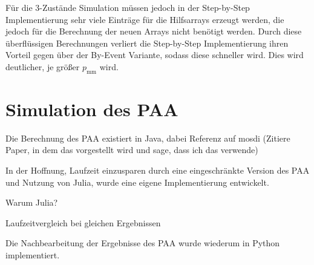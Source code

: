Für die 3-Zustände Simulation müssen jedoch in der Step-by-Step Implementierung sehr viele Einträge für die Hilfsarrays erzeugt werden, die jedoch für die Berechnung der neuen Arrays nicht benötigt werden. Durch diese überflüssigen Berechnungen verliert die Step-by-Step Implementierung ihren Vorteil gegen über der By-Event Variante, sodass diese schneller wird. Dies wird deutlicher, je größer $p_{\text{mm}}$ wird.


\section{Simulation des PAA}
Die Berechnung des PAA existiert in Java, dabei Referenz auf mosdi (Zitiere Paper, in dem das vorgestellt wird und sage, dass ich das verwende)

In der Hoffnung, Laufzeit einzusparen durch eine eingeschränkte Version des PAA und Nutzung von Julia, wurde eine eigene Implementierung entwickelt.


Warum Julia? 

Laufzeitvergleich bei gleichen Ergebnissen

Die Nachbearbeitung der Ergebnisse des PAA wurde wiederum in Python implementiert.


